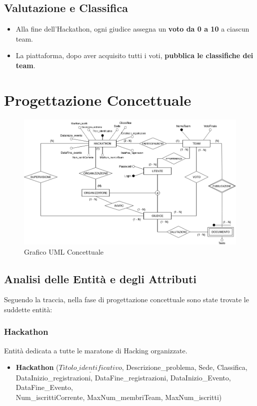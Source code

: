 \documentclass[a4paper, 10pt]{article}
\begin{document}
	\subsection*{Valutazione e Classifica}
	
	\begin{itemize}
		\item Alla fine dell'Hackathon, ogni giudice assegna un \textbf{voto da 0 a 10} a ciascun team.
		\item La piattaforma, dopo aver acquisito tutti i voti, \textbf{pubblica le classifiche dei team}.
	\end{itemize}
	
	\newpage
	\section{Progettazione Concettuale}
	\begin{figure}[H]
		\centering
		\includegraphics[width=1\textwidth]{../Immagini/EERDiagram_Hackathon}
		\caption[Grafico UML]{Grafico UML Concettuale}
	\end{figure}
	\subsection{Analisi delle Entità e degli Attributi}
	Seguendo la traccia, nella fase di progettazione concettuale sono state trovate le suddette entità:
	\subsubsection{Hackathon}
	Entità dedicata a tutte le maratone di Hacking organizzate.
	\begin{itemize}
		\item \textbf{Hackathon} ($\underline{Titolo\_identificativo}$, Descrizione\_problema, Sede, Classifica,\\ DataInizio\_registrazioni, DataFine\_registrazioni, DataInizio\_Evento, DataFine\_Evento, \\Num\_iscrittiCorrente, MaxNum\_membriTeam, MaxNum\_iscritti)
	\end{itemize}
\end{document}
